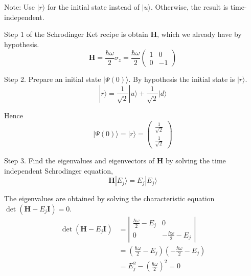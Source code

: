 


\bigskip
Note: Use $|r\rangle$ for the initial state instead of $|u\rangle$.
Otherwise, the result is time-independent.

\bigskip
Step 1 of the Schrodinger Ket recipe is obtain $\mathbf H$,
which we already have by hypothesis.
\begin{equation*}
\mathbf H=\frac{\hbar\omega}{2}\sigma_z
=\frac{\hbar\omega}{2}\begin{pmatrix}1&0\\0&-1\end{pmatrix}
\end{equation*}

Step 2.
Prepare an initial state $|\Psi(0)\rangle$.
By hypothesis the initial state is $|r\rangle$.
\begin{equation*}
|r\rangle=\frac{1}{\sqrt2}|u\rangle+\frac{1}{\sqrt2}|d\rangle
\tag{2.5}
\end{equation*}

Hence
\begin{equation*}
|\Psi(0)\rangle=|r\rangle=\begin{pmatrix}\frac{1}{\sqrt2}\\[1ex]\frac{1}{\sqrt2}\end{pmatrix}
\end{equation*}

Step 3.
Find the eigenvalues and eigenvectors of $\mathbf H$ by solving
the time independent Schrodinger equation,
\begin{equation*}
\mathbf H|E_j\rangle=E_j|E_j\rangle
\end{equation*}

The eigenvalues are obtained by solving the characteristic equation
$\det(\mathbf H-E_j\mathbf I)=0$.
\begin{align*}
\det(\mathbf H-E_j\mathbf I)
&=\left|
\begin{matrix}\frac{\hbar\omega}{2}-E_j&0\\0&-\frac{\hbar\omega}{2}-E_j\end{matrix}
\right|
\\[1ex]
&=\left(\frac{\hbar\omega}{2}-E_j\right)\left(-\frac{\hbar\omega}{2}-E_j\right)
\\[1ex]
&=E_j^2-\left(\frac{\hbar\omega}{2}\right)^2=0
\end{align*}

